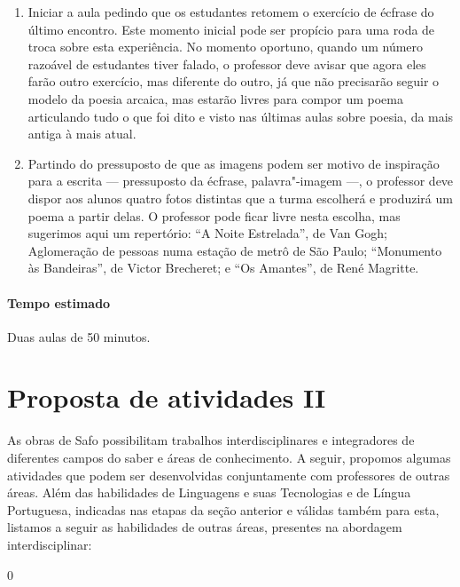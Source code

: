 \documentclass[12pt]{extarticle}
\begin{document}
\begin{enumerate}

\item
Iniciar a aula pedindo que os estudantes retomem  o exercício de écfrase do
último encontro. Este momento inicial pode ser propício para uma roda de troca
sobre esta experiência. No momento oportuno, quando um número razoável de 
estudantes tiver falado, o professor deve avisar que agora eles farão
outro exercício, mas diferente do outro, já que não precisarão seguir 
o modelo da poesia arcaica, mas estarão livres para compor um poema
articulando tudo o que foi dito e visto nas últimas aulas sobre poesia,
da mais antiga à mais atual.

\item
Partindo do pressuposto de que as imagens podem ser motivo de inspiração
para a escrita --- pressuposto da écfrase, palavra"-imagem ---, o professor
deve dispor aos alunos quatro fotos distintas que a turma escolherá e 
produzirá um poema a partir delas. O professor pode ficar livre nesta escolha,
mas sugerimos aqui um repertório: ``A Noite Estrelada'', de Van Gogh; Aglomeração
de pessoas numa estação de metrô de São Paulo; ``Monumento às Bandeiras'', 
de Victor Brecheret; e ``Os Amantes'', de René Magritte.

\end{enumerate}

\paragraph{Tempo estimado} Duas aulas de 50 minutos.



\section{Proposta de atividades II}


As obras de Safo possibilitam trabalhos interdisciplinares e
integradores de diferentes campos do saber e áreas de conhecimento. A
seguir, propomos algumas atividades que podem ser desenvolvidas
conjuntamente com professores de outras áreas. Além das habilidades de
Linguagens e suas Tecnologias e de Língua Portuguesa, indicadas nas
etapas da seção anterior e válidas também para esta, listamos a seguir
as habilidades de outras áreas, presentes na abordagem interdisciplinar:

0
\end{document}
